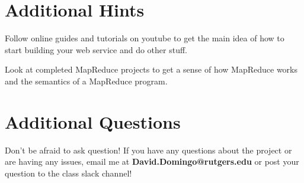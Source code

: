 \documentclass{article}
\begin{document}

\section*{Additional Hints} %
\begin{info}
Follow online guides and tutorials on youtube to get the main idea of how to start building your web service and do other stuff.
\end{info}
\begin{info}
Look at completed MapReduce projects to get a sense of how MapReduce works and the semantics of a MapReduce program.
\end{info}



\section*{Additional Questions} %
Don't be afraid to ask question! If you have any questions about the project or are having any issues, email me at \textbf{David.Domingo@rutgers.edu} or post your question to the class slack channel!


%
\end{document}
